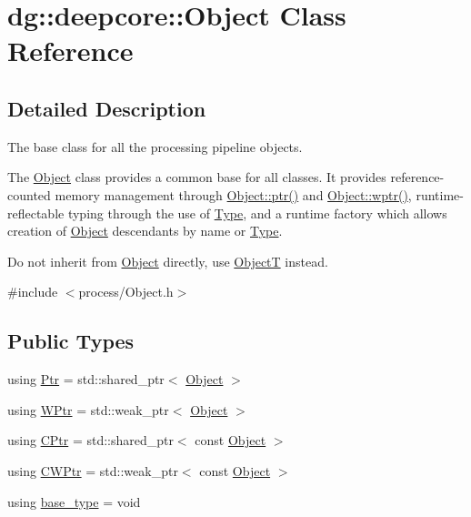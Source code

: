 \hypertarget{classdg_1_1deepcore_1_1_object}{}\section{dg\+:\+:deepcore\+:\+:Object Class Reference}
\label{classdg_1_1deepcore_1_1_object}


\subsection{Detailed Description}
The base class for all the processing pipeline objects. 

The \hyperlink{classdg_1_1deepcore_1_1_object}{Object} class provides a common base for all classes. It provides reference-\/counted memory management through \hyperlink{classdg_1_1deepcore_1_1_object_a8b8b14a44dd1164568619897713753f0}{Object\+::ptr()} and \hyperlink{classdg_1_1deepcore_1_1_object_a7b95cfaa0683b7e9cd7dea00b1605ac1}{Object\+::wptr()}, runtime-\/reflectable typing through the use of \hyperlink{classdg_1_1deepcore_1_1_type}{Type}, and a runtime factory which allows creation of \hyperlink{classdg_1_1deepcore_1_1_object}{Object} descendants by name or \hyperlink{classdg_1_1deepcore_1_1_type}{Type}.

Do not inherit from \hyperlink{classdg_1_1deepcore_1_1_object}{Object} directly, use \hyperlink{classdg_1_1deepcore_1_1_object_t}{ObjectT} instead. 

{\ttfamily \#include $<$process/\+Object.\+h$>$}

\subsection*{Public Types}
\begin{DoxyCompactItemize}
\item 
using \hyperlink{classdg_1_1deepcore_1_1_object_a4565c5c2ba828aaaa4354befbac8b2f9}{Ptr} = std\+::shared\+\_\+ptr$<$ \hyperlink{classdg_1_1deepcore_1_1_object}{Object} $>$
\item 
using \hyperlink{classdg_1_1deepcore_1_1_object_ab4d85713f22f753fff52e1d4a2769251}{W\+Ptr} = std\+::weak\+\_\+ptr$<$ \hyperlink{classdg_1_1deepcore_1_1_object}{Object} $>$
\item 
using \hyperlink{classdg_1_1deepcore_1_1_object_a9929d3554639c9ed70d26aa8ede60cca}{C\+Ptr} = std\+::shared\+\_\+ptr$<$ const \hyperlink{classdg_1_1deepcore_1_1_object}{Object} $>$
\item 
using \hyperlink{classdg_1_1deepcore_1_1_object_adc394d82cc6a5fb85e7d65fc065d867f}{C\+W\+Ptr} = std\+::weak\+\_\+ptr$<$ const \hyperlink{classdg_1_1deepcore_1_1_object}{Object} $>$
\item 
using \hyperlink{classdg_1_1deepcore_1_1_object_acffbbe34053468dfb48debd8481a804d}{base\+\_\+type} = void
\end{DoxyCompactItemize}
